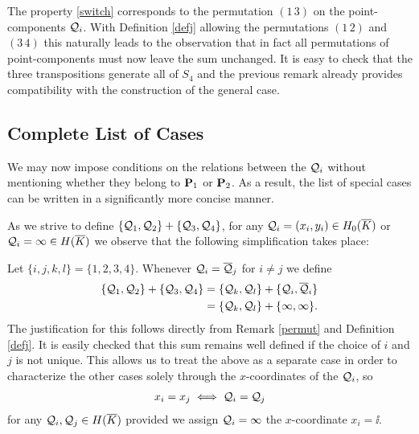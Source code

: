 \documentclass[english,11pt,a4paper]{article}
\begin{document}
\begin{remark}\label{permut}
	The property \eqref{switch} corresponds to the permutation $(1 \, 3)$ on the point-components $\q_i$. With Definition \ref{defj} allowing the permutations $(1 \, 2)$ and $(3 \, 4)$ this naturally leads to the observation that in fact all permutations of point-components must now leave the sum unchanged. It is easy to check that the three transpositions generate all of $S_4$ and the previous remark already provides compatibility with the construction of the general case.
\end{remark}











\subsection{Complete List of Cases}

We may now impose conditions on the relations between the $\q_i$ without mentioning whether they belong to $\P_1$ or $\P_2$. As a result, the list of special cases can be written in a significantly more concise manner.

As we strive to define $\{ \q_1 , \q_2 \} + \{ \q_3 , \q_4 \}$, for any $\q_i = (x_i,y_i) \in \enkb$ or $\q_i = \infty \in \ekb$ we observe that the following simplification takes place:

Let $\{ i,j,k,l \}=\{ 1,2,3,4 \}$. Whenever $\q_i = \bar \q_j$ for $i \neq j$ we define
\begin{align*}
  \{ \q_1 , \q_2 \} + \{ \q_3 , \q_4 \} &= \{ \q_k , \q_l \} + \{ \q_i , \bar \q_i \}\\
  &= \{ \q_k , \q_l \} + \{ \infty, \infty \}.
\end{align*}
The justification for this follows directly from Remark \ref{permut} and Definition \ref{defj}. It is easily checked that this sum remains well defined if the choice of $i$ and $j$ is not unique. This allows us to treat the above as a separate case in order to characterize the other cases solely through the $x$-coordinates of the $\q_i$, so%
\begin{align*}
  x_i = x_j \iff \q_i = \q_j
\end{align*}
for any $\q_i, \q_j \in \ekb$ provided we assign $\q_i = \infty$ the $x$-coordinate $x_i = \ii$.
\end{document}
